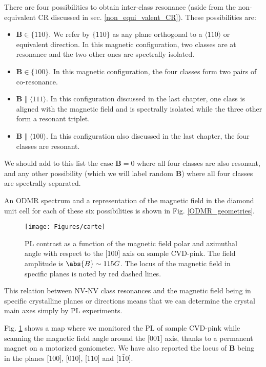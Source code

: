 \documentclass[a4paper,11pt]{report}
\begin{document}
There are four possibilities to obtain inter-class resonance (aside from the non-equivalent CR discussed in sec. \ref{non_equi_valent_CR}). These possibilities are:
\begin{itemize}
\item $\mathbf{B} \in \{110\}$. We refer by $\{110\}$ as any plane orthogonal to a $\langle 110 \rangle$ or equivalent direction. In this magnetic configuration, two classes are at resonance and the two other ones are spectrally isolated.
\item $\mathbf{B} \in \{100\}$. In this magnetic configuration, the four classes form two pairs of co-resonance.
\item $\mathbf{B} \parallel \langle 111 \rangle$. In this configuration discussed in the last chapter, one class is aligned with the magnetic field and is spectrally isolated while the three other form a resonant triplet.
\item $\mathbf{B} \parallel \langle 100 \rangle$. In this configuration also discussed in the last chapter, the four classes are resonant.
\end{itemize}
We should add to this list the case $\mathbf{B}=0$ where all four classes are also resonant, and any other possibility (which we will label random $\mathbf{B}$) where all four classes are spectrally separated. 

An ODMR spectrum and a representation of the magnetic field in the diamond unit cell for each of these six possibilities is shown in Fig. \ref{ODMR_geometries}.

\begin{figure}[h]
\centering
\texttt{[image: Figures/carte]}
\caption{PL contrast as a function of the magnetic field polar and azimuthal angle with respect to the [100] axis on sample CVD-pink. The field amplitude is $\abs{B} \sim 115 G$. The locus of the magnetic field in specific planes is noted by red dashed lines.}
\label{Carte}
\end{figure}

This relation between NV-NV class resonances and the magnetic field being in specific crystalline planes or directions means that we can determine the crystal main axes simply by PL experiments.

Fig. \ref{Carte} shows a map where we monitored the PL of sample CVD-pink while scanning the magnetic field angle around the [001] axis, thanks to a permanent magnet on a motorized goniometer. We have also reported the locus of $\mathbf{B}$ being in the planes [100], [010], [110] and [$1\bar 1 0$].
\end{document}
